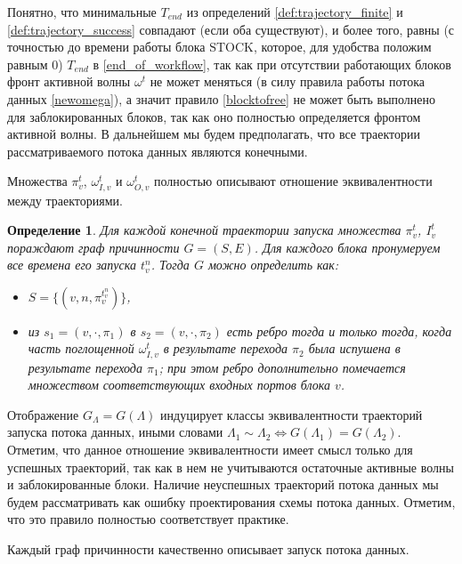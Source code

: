 \documentclass[10pt,a4paper]{article}
\newtheorem{defen}{Определение}
\newcommand{\stock}{\text{STOCK}}
\begin{document}
  Понятно, что минимальные $T_{end}$ из определений \ref{def:trajectory_finite} и \ref{def:trajectory_success} совпадают (если оба существуют), и более того, равны
  (с точностью до времени работы блока $\stock$, которое, для удобства положим равным $0$) $T_{end}$ в \eqref{end_of_workflow}, так как при отсутствии работающих
  блоков фронт активной волны $\omega^t$ не может меняться (в силу правила работы потока данных \eqref{newomega}),
  а значит правило \eqref{blocktofree} не может быть выполнено для заблокированных блоков, так как оно полностью определяется фронтом активной волны.
  В дальнейшем мы будем предполагать, что все траектории рассматриваемого потока данных являются конечными.
  
  Множества $\pi^t_v$, $\omega^t_{I, v}$ и $\omega^t_{O, v}$ полностью описывают отношение эквивалентности между траекториями.
  \begin{defen}
    Для каждой конечной траектории запуска множества $\pi^t_v$, $I^t_v$ пораждают граф причинности $G = (S, E)$.
    Для каждого блока пронумеруем все времена его запуска $t^n_v$. Тогда $G$ можно определить как:
    \begin{itemize}
      \item $S = \{ (v, n, \pi^{t^n_v}_v) \}$,\\
      \item из $s_1 = (v, \cdot, \pi_1)$ в $s_2 = (v, \cdot, \pi_2)$ есть ребро тогда и только тогда,
      когда часть поглощенной $\omega^t_{I, v}$ в результате перехода $\pi_2$ была испушена в результате перехода $\pi_1$;
      при этом ребро дополнительно помечается множеством соответствующих входных портов блока $v$.
    \end{itemize}
  \end{defen}
  
  Отображение $G_{\Lambda} = G(\Lambda)$ индуцирует классы эквивалентности траекторий запуска потока данных,
  иными словами $\Lambda_1 \sim \Lambda_2 \Leftrightarrow G(\Lambda_1) = G(\Lambda_2)$.
  Отметим, что данное отношение эквивалентности имеет смысл только для успешных траекторий, так как в нем не учитываются остаточные активные волны и заблокированные блоки.
  Наличие неуспешных траекторий потока данных мы будем рассматривать как ошибку проектирования схемы потока данных. Отметим, что это правило полностью соответствует практике.
  
  Каждый граф причинности качественно описывает запуск потока данных.
  
\end{document}
